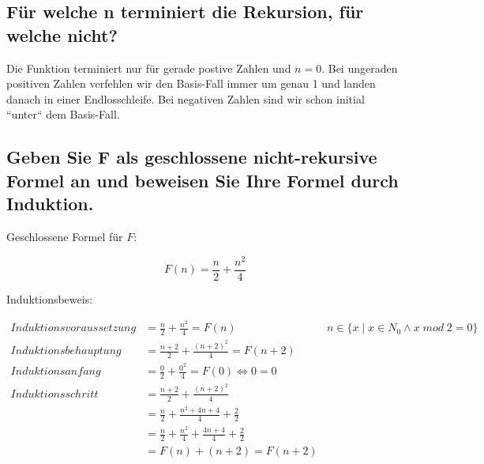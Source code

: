 \documentclass{article}
\begin{document}
\subsection{Für welche n terminiert die Rekursion, für welche nicht?}

Die Funktion terminiert nur für gerade postive Zahlen und $n = 0$. Bei ungeraden positiven Zahlen verfehlen wir den
Basis-Fall immer um genau 1 und landen danach in einer Endlosschleife. Bei negativen Zahlen sind wir schon initial
``unter`` dem Basis-Fall.

\subsection{Geben Sie F als geschlossene nicht-rekursive Formel an und beweisen Sie Ihre Formel durch Induktion.}

Geschlossene Formel für $F$:

$$F(n) = \frac{n}{2} + \frac{n^2}{4}$$

\vspace{1em}

\begin{flushleft}
	Induktionsbeweis:
\end{flushleft}

\begin{align*}
	Induktionsvoraussetzung & = \frac{n}{2} + \frac{n^2}{4} = F(n)                           & n \in \{ x \mid x \in N_0 \wedge x \; mod \; 2 = 0 \} \\
	Induktionsbehauptung    & = \frac{n + 2}{2} + \frac{(n + 2)^2}{4} = F(n + 2)                                                                     \\
	Induktionsanfang        & = \frac{0}{2} + \frac{0^2}{4} = F(0) \Leftrightarrow 0 = 0                                                             \\
	Induktionsschritt       & = \frac{n + 2}{2} + \frac{(n + 2)^2}{4}                                                                                \\
	                        & = \frac{n}{2} + \frac{n^2 + 4n + 4}{4} + \frac{2}{2}                                                                   \\
	                        & = \frac{n}{2} + \frac{n^2}{4} + \frac{4n + 4}{4} + \frac{2}{2}                                                         \\
	                        & = F(n) + (n + 2) = F(n + 2)                                                                                            \\
\end{align*}
\end{document}
